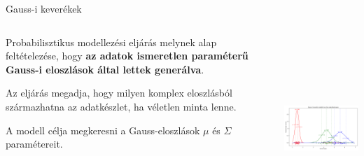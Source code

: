 \documentclass[english, aspectratio=169]{beamer}
\begin{document}
\begin{frame}{Gauss-i keverékek}
\begin{columns}
\begin{column}{.5\textwidth}
Probabilisztikus modellezési eljárás melynek alap feltételezése, hogy \textbf{az adatok ismeretlen paraméterű Gauss-i eloszlások által lettek generálva}.\par\smallskip
Az eljárás megadja, hogy milyen komplex eloszlásból származhatna az adatkészlet, ha véletlen minta lenne.\par\smallskip
A modell célja megkeresni a Gauss-eloszlások $\mu$ és $\Sigma$ paramétereit.
\end{column}
\begin{column}{.5\textwidth}
\begin{center}
\includegraphics[width=7cm, height=7cm, keepaspectratio]{images/generative_12.png}
\end{center}
\end{column}
\end{columns}
\end{frame}
\end{document}
